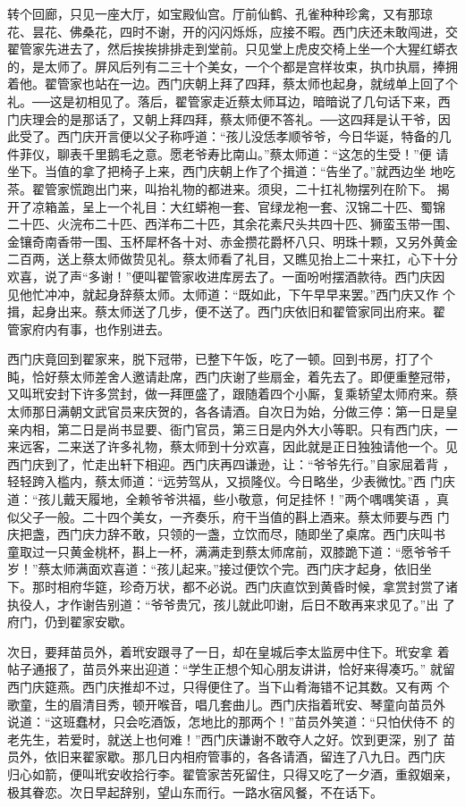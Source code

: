 转个回廊，只见一座大厅，如宝殿仙宫。厅前仙鹤、孔雀种种珍禽，又有那琼
花、昙花、佛桑花，四时不谢，开的闪闪烁烁，应接不暇。西门庆还未敢闯进，交
翟管家先进去了，然后挨挨排排走到堂前。只见堂上虎皮交椅上坐一个大猩红蟒衣
的，是太师了。屏风后列有二三十个美女，一个个都是宫样妆束，执巾执扇，捧拥
着他。翟管家也站在一边。西门庆朝上拜了四拜，蔡太师也起身，就绒单上回了个
礼。──这是初相见了。落后，翟管家走近蔡太师耳边，暗暗说了几句话下来，西
门庆理会的是那话了，又朝上拜四拜，蔡太师便不答礼。──这四拜是认干爷，因
此受了。西门庆开言便以父子称呼道：“孩儿没恁孝顺爷爷，今日华诞，特备的几
件菲仪，聊表千里鹅毛之意。愿老爷寿比南山。”蔡太师道：“这怎的生受！”便
请坐下。当值的拿了把椅子上来，西门庆朝上作了个揖道：“告坐了。”就西边坐
地吃茶。翟管家慌跑出门来，叫抬礼物的都进来。须臾，二十扛礼物摆列在阶下。
揭开了凉箱盖，呈上一个礼目：大红蟒袍一套、官绿龙袍一套、汉锦二十匹、蜀锦
二十匹、火浣布二十匹、西洋布二十匹，其余花素尺头共四十匹、狮蛮玉带一围、
金镶奇南香带一围、玉杯犀杯各十对、赤金攒花爵杯八只、明珠十颗，又另外黄金
二百两，送上蔡太师做贽见礼。蔡太师看了礼目，又瞧见抬上二十来扛，心下十分
欢喜，说了声“多谢！”便叫翟管家收进库房去了。一面吩咐摆酒款待。西门庆因
见他忙冲冲，就起身辞蔡太师。太师道：“既如此，下午早早来罢。”西门庆又作
个揖，起身出来。蔡太师送了几步，便不送了。西门庆依旧和翟管家同出府来。翟
管家府内有事，也作别进去。

西门庆竟回到翟家来，脱下冠带，已整下午饭，吃了一顿。回到书房，打了个
盹，恰好蔡太师差舍人邀请赴席，西门庆谢了些扇金，着先去了。即便重整冠带，
又叫玳安封下许多赏封，做一拜匣盛了，跟随着四个小厮，复乘轿望太师府来。蔡
太师那日满朝文武官员来庆贺的，各各请酒。自次日为始，分做三停：第一日是皇
亲内相，第二日是尚书显要、衙门官员，第三日是内外大小等职。只有西门庆，一
来远客，二来送了许多礼物，蔡太师到十分欢喜，因此就是正日独独请他一个。见
西门庆到了，忙走出轩下相迎。西门庆再四谦逊，让：“爷爷先行。”自家屈着背
，轻轻跨入槛内，蔡太师道：“远劳驾从，又损隆仪。今日略坐，少表微忱。”西
门庆道：“孩儿戴天履地，全赖爷爷洪福，些小敬意，何足挂怀！”两个喁喁笑语
，真似父子一般。二十四个美女，一齐奏乐，府干当值的斟上酒来。蔡太师要与西
门庆把盏，西门庆力辞不敢，只领的一盏，立饮而尽，随即坐了桌席。西门庆叫书
童取过一只黄金桃杯，斟上一杯，满满走到蔡太师席前，双膝跪下道：“愿爷爷千
岁！”蔡太师满面欢喜道：“孩儿起来。”接过便饮个完。西门庆才起身，依旧坐
下。那时相府华筵，珍奇万状，都不必说。西门庆直饮到黄昏时候，拿赏封赏了诸
执役人，才作谢告别道：“爷爷贵冗，孩儿就此叩谢，后日不敢再来求见了。”出
了府门，仍到翟家安歇。

次日，要拜苗员外，着玳安跟寻了一日，却在皇城后李太监房中住下。玳安拿
着帖子通报了，苗员外来出迎道：“学生正想个知心朋友讲讲，恰好来得凑巧。”
就留西门庆筵燕。西门庆推却不过，只得便住了。当下山肴海错不记其数。又有两
个歌童，生的眉清目秀，顿开喉音，唱几套曲儿。西门庆指着玳安、琴童向苗员外
说道：“这班蠢材，只会吃酒饭，怎地比的那两个！”苗员外笑道：“只怕伏侍不
的老先生，若爱时，就送上也何难！”西门庆谦谢不敢夺人之好。饮到更深，别了
苗员外，依旧来翟家歇。那几日内相府管事的，各各请酒，留连了八九日。西门庆
归心如箭，便叫玳安收拾行李。翟管家苦死留住，只得又吃了一夕酒，重叙姻亲，
极其眷恋。次日早起辞别，望山东而行。一路水宿风餐，不在话下。

